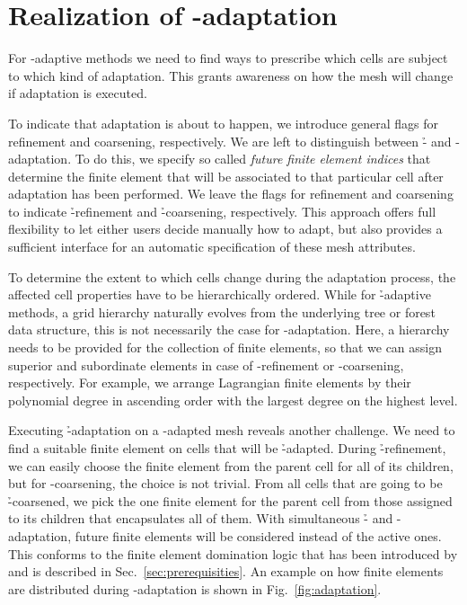 \section{Realization of \hp-adaptation}
\label{sec:adaptation}

For \hp{}-adaptive methods we need to find ways to prescribe which cells are subject to which kind of adaptation. This grants awareness on how the mesh will change if adaptation is executed.

To indicate that adaptation is about to happen, we introduce general flags for refinement and coarsening, respectively. We are left to distinguish between \h- and \p-adaptation. To do this, we specify so called \textit{future finite element indices} that determine the finite element that will be associated to that particular cell after adaptation has been performed. We leave the flags for refinement and coarsening to indicate \h-refinement and \h-coarsening, respectively.
This approach offers full flexibility to let either users decide manually how to adapt, but also provides a sufficient interface for an automatic specification of these mesh attributes.

To determine the extent to which cells change during the adaptation process, the affected cell properties have to be hierarchically ordered. While for \h-adaptive methods, a grid hierarchy naturally evolves from the underlying tree or forest data structure, this is not necessarily the case for \p-adaptation. Here, a hierarchy needs to be provided for the collection of finite elements, so that we can assign superior and subordinate elements in case of \p-refinement or \p-coarsening, respectively. For example, we arrange Lagrangian finite elements by their polynomial degree in ascending order with the largest degree on the highest level.

Executing \h-adaptation on a \p-adapted mesh reveals another challenge. We need to find a suitable finite element on cells that will be \h-adapted. During \h-refinement, we can easily choose the finite element from the parent cell for all of its children, but for \p-coarsening, the choice is not trivial. From all cells that are going to be \h-coarsened, we pick the one finite element for the parent cell from those assigned to its children that encapsulates all of them. With simultaneous \h- and \p-adaptation, future finite elements will be considered instead of the active ones. This conforms to the finite element domination logic that has been introduced by \textcite{bangerth2009} and is described in Sec.~\ref{sec:prerequisities}. An example on how finite elements are distributed during \hp-adaptation is shown in Fig.~\ref{fig:adaptation}.

